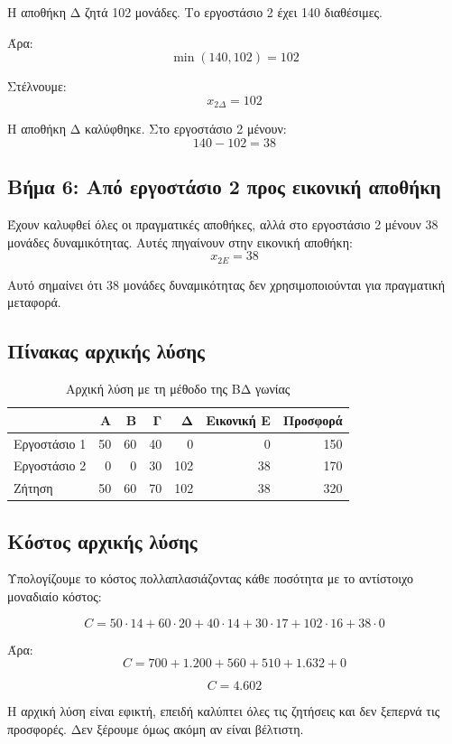 \documentclass[12pt,a4paper]{article}
\begin{document}
Η αποθήκη Δ ζητά 102 μονάδες. Το εργοστάσιο 2 έχει 140 διαθέσιμες.

Άρα:
\[
\min(140,102)=102
\]

Στέλνουμε:
\[
x_{2\Delta}=102
\]

Η αποθήκη Δ καλύφθηκε. Στο εργοστάσιο 2 μένουν:
\[
140-102=38
\]

\subsection{Βήμα 6: Από εργοστάσιο 2 προς εικονική αποθήκη}

Έχουν καλυφθεί όλες οι πραγματικές αποθήκες, αλλά στο εργοστάσιο 2 μένουν 38 μονάδες δυναμικότητας. Αυτές πηγαίνουν στην εικονική αποθήκη:
\[
x_{2E}=38
\]

Αυτό σημαίνει ότι 38 μονάδες δυναμικότητας δεν χρησιμοποιούνται για πραγματική μεταφορά.

\subsection{Πίνακας αρχικής λύσης}

\begin{table}[H]
\centering
\caption{Αρχική λύση με τη μέθοδο της ΒΔ γωνίας}
\small
\begin{tabular}{lrrrrrr}
\toprule
 & \textbf{Α} & \textbf{Β} & \textbf{Γ} & \textbf{Δ} & \textbf{Εικονική Ε} & \textbf{Προσφορά} \\
\midrule
Εργοστάσιο 1 & 50 & 60 & 40 & 0 & 0 & 150 \\
Εργοστάσιο 2 & 0 & 0 & 30 & 102 & 38 & 170 \\
\midrule
Ζήτηση & 50 & 60 & 70 & 102 & 38 & 320 \\
\bottomrule
\end{tabular}
\end{table}

\subsection{Κόστος αρχικής λύσης}

Υπολογίζουμε το κόστος πολλαπλασιάζοντας κάθε ποσότητα με το αντίστοιχο μοναδιαίο κόστος:

\[
C=50\cdot14+60\cdot20+40\cdot14+30\cdot17+102\cdot16+38\cdot0
\]

Άρα:
\[
C=700+1.200+560+510+1.632+0
\]

\[
\boxed{C=4.602}
\]

Η αρχική λύση είναι εφικτή, επειδή καλύπτει όλες τις ζητήσεις και δεν ξεπερνά τις προσφορές. Δεν ξέρουμε όμως ακόμη αν είναι βέλτιστη.
\end{document}
